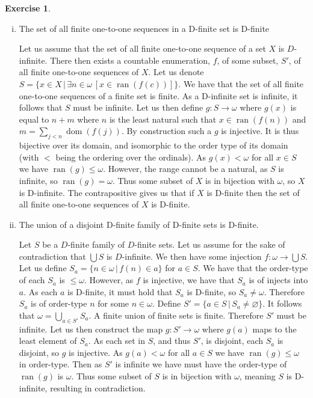 \documentclass{article}
\theoremstyle{definition}
\newtheorem{exer}{Exercise}[section]
\newcommand*{\mtset}{\ensuremath{\varnothing}}
\DeclareMathOperator{\ran}{ran}
\DeclareMathOperator{\dom}{dom}
\newlength{\defparindent}
\newenvironment{answer}
    {\begin{mdframed}[backgroundcolor=gray!15, linewidth=0pt] \setlength{\parindent}{\defparindent}}
    {\end{mdframed}}
\begin{document}
\begin{exer}
\begin{enumerate}[(i)]
        \item The set of all finite one-to-one sequences in a D-finite set is D-finite
        \begin{answer}
            Let us assume that the set of all finite one-to-one sequence of a set $X$ is $D$-infinite. There then exists a countable enumeration, $f$, of some subset, $S'$, of all finite one-to-one sequences of $X$. Let us denote $S = \{x \in X \, | \, \exists n \in \omega \, [x \in \ran(f(c))]\}$. We have that the set of all finite one-to-one sequences of a finite set is finite. As a D-infinite set is infinite, it follows that $S$ must be infinite. Let us then define $g: S \to \omega$ where $g(x)$ is equal to $n + m$ where $n$ is the least natural such that $x \in \ran(f(n))$ and $m = \sum_{j < n} \dom(f(j))$. By construction such a $g$ is injective. It is thus bijective over its domain, and isomorphic to the order type of its domain (with $<$ being the ordering over the ordinals). As $g(x) < \omega$ for all $x \in S$ we have $\ran(g) \le \omega$. However, the range cannot be a natural, as $S$ is infinite, so $\ran(g) = \omega$. Thus some subset of $X$ is in bijection with $\omega$, so $X$ is D-infinite. The contrapositive gives us that if $X$ is D-finite then the set of all finite one-to-one sequences of $X$ is D-finite.
        \end{answer}

        \item The union of a disjoint D-finite family of D-finite sets is D-finite.
        \begin{answer}
            Let $S$ be a $D$-finite family of $D$-finite sets. Let us assume for the sake of contradiction that $\bigcup S$ is $D$-infinite. We then have some injection $f: \omega \to \bigcup S$. Let us define $S_a = \{n \in \omega \, | \, f(n) \in a\}$ for $a \in S$. We have that the order-type of each $S_a$ is  $\le \omega$. However, as $f$ is injective, we have that $S_a$ is of injects into $a$. As each $a$ is D-finite, it must hold that $S_a$ is D-finite, so $S_a \ne \omega$. Therefore $S_a$ is of order-type $n$ for some $n \in \omega$. Define $S' = \{a \in S \, | \, S_a \ne \mtset\}$. It follows that $\omega = \bigcup_{a \in S'} S_a$. A finite union of finite sets is finite. Therefore $S'$ must be infinite. Let us then construct the map $g: S' \to \omega$ where $g(a)$ maps to the least element of $S_a$. As each set in $S$, and thus $S'$, is disjoint, each $S_a$ is disjoint, so $g$ is injective. As $g(a) < \omega$ for all $a \in S$ we have $\ran(g) \le \omega$ in order-type. Then as $S'$ is infinite we have must have the order-type of $\ran(g)$ is $\omega$. Thus some subset of $S$ is in bijection with $\omega$, meaning $S$ is D-infinite, resulting in contradiction.
        \end{answer}
    \end{enumerate}
\end{exer}
\end{document}
